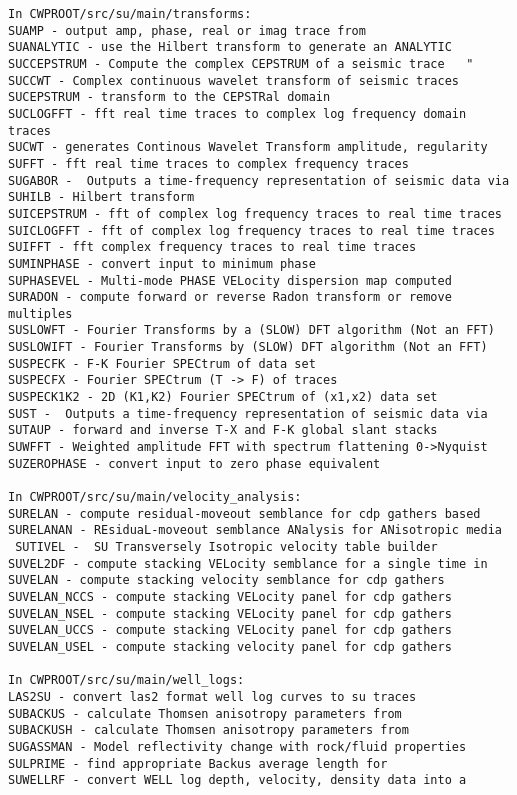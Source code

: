 {{\begin{verbatim}
In CWPROOT/src/su/main/transforms:
SUAMP - output amp, phase, real or imag trace from			
SUANALYTIC - use the Hilbert transform to generate an ANALYTIC	
SUCCEPSTRUM - Compute the complex CEPSTRUM of a seismic trace 	"
SUCCWT - Complex continuous wavelet transform of seismic traces	
SUCEPSTRUM - transform to the CEPSTRal domain				
SUCLOGFFT - fft real time traces to complex log frequency domain traces
SUCWT - generates Continous Wavelet Transform amplitude, regularity	
SUFFT - fft real time traces to complex frequency traces		
SUGABOR -  Outputs a time-frequency representation of seismic data via
SUHILB - Hilbert transform					
SUICEPSTRUM - fft of complex log frequency traces to real time traces
SUICLOGFFT - fft of complex log frequency traces to real time traces
SUIFFT - fft complex frequency traces to real time traces	
SUMINPHASE - convert input to minimum phase				
SUPHASEVEL - Multi-mode PHASE VELocity dispersion map computed
SURADON - compute forward or reverse Radon transform or remove multiples
SUSLOWFT - Fourier Transforms by a (SLOW) DFT algorithm (Not an FFT)
SUSLOWIFT - Fourier Transforms by (SLOW) DFT algorithm (Not an FFT)
SUSPECFK - F-K Fourier SPECtrum of data set			
SUSPECFX - Fourier SPECtrum (T -> F) of traces 		
SUSPECK1K2 - 2D (K1,K2) Fourier SPECtrum of (x1,x2) data set		
SUST -  Outputs a time-frequency representation of seismic data via
SUTAUP - forward and inverse T-X and F-K global slant stacks		
SUWFFT - Weighted amplitude FFT with spectrum flattening 0->Nyquist	
SUZEROPHASE - convert input to zero phase equivalent			

In CWPROOT/src/su/main/velocity_analysis:
SURELAN - compute residual-moveout semblance for cdp gathers based	
SURELANAN - REsiduaL-moveout semblance ANalysis for ANisotropic media	
 SUTIVEL -  SU Transversely Isotropic velocity table builder		
SUVEL2DF - compute stacking VELocity semblance for a single time in   
SUVELAN - compute stacking velocity semblance for cdp gathers		     
SUVELAN_NCCS - compute stacking VELocity panel for cdp gathers	     
SUVELAN_NSEL - compute stacking VELocity panel for cdp gathers	     
SUVELAN_UCCS - compute stacking VELocity panel for cdp gathers	     
SUVELAN_USEL - compute stacking velocity panel for cdp gathers	     

In CWPROOT/src/su/main/well_logs:
LAS2SU - convert las2 format well log curves to su traces	
SUBACKUS - calculate Thomsen anisotropy parameters from 	
SUBACKUSH - calculate Thomsen anisotropy parameters from 	
SUGASSMAN - Model reflectivity change with rock/fluid properties	
SULPRIME - find appropriate Backus average length for  	
SUWELLRF - convert WELL log depth, velocity, density data into a	


\end{verbatim}}}
